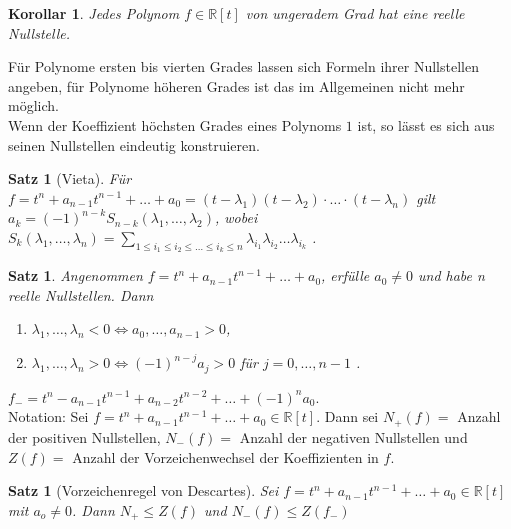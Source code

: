 \documentclass[12pt,a4paper]{article}
\theoremstyle{plain}
\newtheorem{Satz}[Theorem]{Satz}
\newtheorem{Korollar}[Theorem]{Korollar}
\newcommand{\R}{\mathbb{R}}
\numberwithin{equation}{section}
\begin{document}
\begin{Korollar}
Jedes Polynom $f\in\R[t]$ von ungeradem Grad hat eine reelle Nullstelle.
\end{Korollar}
Für Polynome ersten bis vierten Grades lassen sich Formeln ihrer Nullstellen angeben, für Polynome höheren Grades ist das im Allgemeinen nicht mehr möglich.\\
Wenn der Koeffizient höchsten Grades eines Polynoms $1$ ist, so lässt es sich aus seinen Nullstellen eindeutig konstruieren.
\begin{Satz}[Vieta]
Für $f=t^n+a_{n-1}t^{n-1}+\ldots+a_0=(t-\lambda_1)(t-\lambda_2)\cdot\ldots\cdot(t-\lambda_n)$ gilt $a_k=(-1)^{n-k}S_{n-k}(\lambda_1,\ldots,\lambda_2)$, wobei $S_k(\lambda_1,\ldots,\lambda_n)=\sum_{1\leq i_1\leq i_2\leq\ldots\leq i_k\leq n}{\lambda_{i_1}\lambda_{i_2}\ldots\lambda_{i_k}}$ .
\end{Satz}
\begin{Satz}
Angenommen $f=t^n+a_{n-1}t^{n-1}+\ldots+a_0$, erfülle $a_0\neq 0$ und habe n reelle Nullstellen. Dann
\begin{enumerate}
\renewcommand{\labelenumi}{\emph{(\alph{enumi})}}
\item $\lambda_1,\ldots,\lambda_n<0 \Leftrightarrow a_0,\ldots,a_{n-1}>0$,
\item $\lambda_1,\ldots,\lambda_n>0 \Leftrightarrow (-1)^{n-j}a_j>0$ für $j=0,\ldots,n-1$ .
\end{enumerate}
\end{Satz}
$f_{-}=t^n-a_{n-1}t^{n-1}+a_{n-2}t^{n-2}+\ldots+(-1)^n a_0$.\\
Notation: Sei $f=t^n+a_{n-1}t^{n-1}+\ldots+a_0\in\R[t]$. Dann sei $N_{+}(f) = $ Anzahl der positiven Nullstellen, $N_{-}(f) = $ Anzahl der negativen Nullstellen und $Z(f) = $ Anzahl der Vorzeichenwechsel der Koeffizienten in $f$.
\begin{Satz}[Vorzeichenregel von Descartes]
Sei $f=t^n+a_{n-1}t^{n-1}+\ldots+a_0\in\R[t]$ mit $a_o\neq 0$. Dann $N_{+}\leq Z(f)$ und $N_{-}(f)\leq Z(f_{-})$
\end{Satz}
\end{document}
